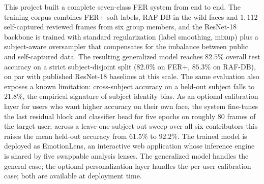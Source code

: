 \documentclass[12pt,a4paper]{article}
\begin{document}
This project built a complete seven-class FER system from end
to end. The training corpus combines FER+ soft labels, RAF-DB
in-the-wild faces and $1{,}112$ self-captured reviewed frames
from six group members, and the ResNet-18 backbone is trained
with standard regularization (label smoothing, mixup) plus a
subject-aware oversampler that compensates for the imbalance
between public and self-captured data. The resulting
generalized model reaches $82.5\%$ overall test accuracy on a
strict subject-disjoint split ($82.0\%$ on FER+, $85.3\%$ on
RAF-DB), on par with published ResNet-18 baselines at this
scale. The same evaluation also exposes a known limitation:
cross-subject accuracy on a held-out subject falls to
$21.8\%$, the empirical signature of subject identity bias.
As an optional calibration layer for users who want higher
accuracy on their own face, the system fine-tunes the last
residual block and classifier head for five epochs on roughly
$80$ frames of the target user; across a leave-one-subject-out
sweep over all six contributors this raises the mean held-out
accuracy from $61.5\%$ to $92.2\%$. The trained model is
deployed as EmotionLens, an interactive web application whose
inference engine is shared by five swappable analysis lenses.
The generalized model handles the general case; the optional
personalization layer handles the per-user calibration case;
both are available at deployment time.

\newpage
\printbibliography
\end{document}
